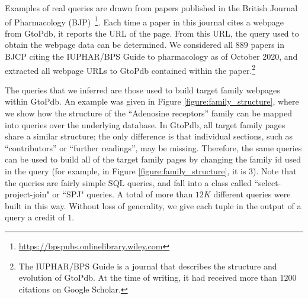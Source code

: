 

Examples of real queries are drawn from papers published in the British Journal of Pharmacology (BJP)~\footnote{\url{https://bpspubs.onlinelibrary.wiley.com}}.  Each time a paper in this journal cites a webpage from GtoPdb, it reports the URL of the page. From this URL, the query used to obtain the webpage data can be determined. 
We considered all $889$ papers in BJCP citing the IUPHAR/BPS Guide to pharmacology \citep{iuphar2018} as of October 2020, and extracted all webpage URLs to GtoPdb contained within the paper.\footnote{The IUPHAR/BPS Guide is a journal that describes the structure and evolution of GtoPdb. At the time of writing, it had received more than $1200$ citations on Google Scholar.}

The queries that we inferred are those used to build target family webpages within GtoPdb.
An example was given in Figure \ref{figure:family_structure}, where we show how the structure of the ``Adenosine receptors'' family can be mapped into  queries over the underlying database. %
In GtoPdb, all target family pages share a similar structure; the only difference is that individual sections, such as ``contributors'' or ``further readings'', may be missing.
Therefore, the same queries can be used to build all of the target family pages by changing the family id used in the query (for example, in Figure \ref{figure:family_structure}, it is 3).
Note that the queries are fairly simple SQL queries, and fall into a class called ``select-project-join" or ``SPJ" queries. 
A total of more than $12K$ different queries were built in this way.
Without loss of generality, we give each tuple in the output of a query a credit of $1$.

